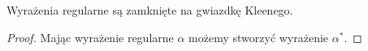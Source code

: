 \begin{theorem}
Wyrażenia regularne są zamknięte na gwiazdkę Kleenego.
\end{theorem}

\begin{proof}
 Mając wyrażenie regularne \(\alpha\) możemy stworzyć wyrażenie \(\alpha^*\).
\end{proof}
